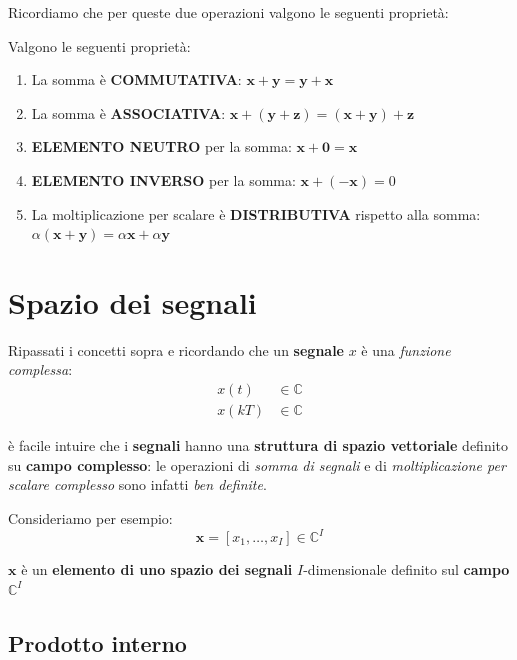 Ricordiamo che per queste due operazioni valgono
le seguenti proprietà:

\begin{prop}
    Valgono le seguenti proprietà:
    \begin{enumerate}
        \item La somma è \textbf{COMMUTATIVA}: $\mathbf{x} + \mathbf{y} = \mathbf{y} + \mathbf{x}$
        \item La somma è \textbf{ASSOCIATIVA}: $\mathbf{x} + (\mathbf{y} + \mathbf{z}) 
            = (\mathbf{x} + \mathbf{y}) + \mathbf{z}$
        \item \textbf{ELEMENTO NEUTRO} per la somma: $\mathbf{x} + \mathbf{0} = \mathbf{x}$
        \item \textbf{ELEMENTO INVERSO} per la somma: $\mathbf{x} + (-\mathbf{x}) = 0$
        \item La moltiplicazione per scalare è \textbf{DISTRIBUTIVA} rispetto alla somma:
            $\alpha(\mathbf{x} + \mathbf{y}) = \alpha \mathbf{x} + \alpha \mathbf{y}$
    \end{enumerate}
\end{prop}

\section{Spazio dei segnali}

Ripassati i concetti sopra e ricordando che un \textbf{segnale} $x$ 
è una \textit{funzione complessa}:
\[
    \begin{aligned}
        x(t) &\in \mathbb{C} \\ 
        x(kT) &\in \mathbb{C}
    \end{aligned}
\]

è facile intuire che i \textbf{segnali} hanno una \textbf{struttura di spazio vettoriale}
definito su \textbf{campo complesso}: le operazioni di \textit{somma di segnali} e
di \textit{moltiplicazione per scalare complesso} sono infatti \textit{ben definite}.

Consideriamo per esempio:
\[
    \mathbf{x} = [x_{1},\ldots , x_I] \in \mathbb{C}^I
\]

\begin{remark}
    $\mathbf{x}$ è un \textbf{elemento di uno spazio dei segnali}
    $I$-dimensionale definito sul \textbf{campo} $\mathbb{C}^I$
\end{remark}

\subsection{Prodotto interno}

